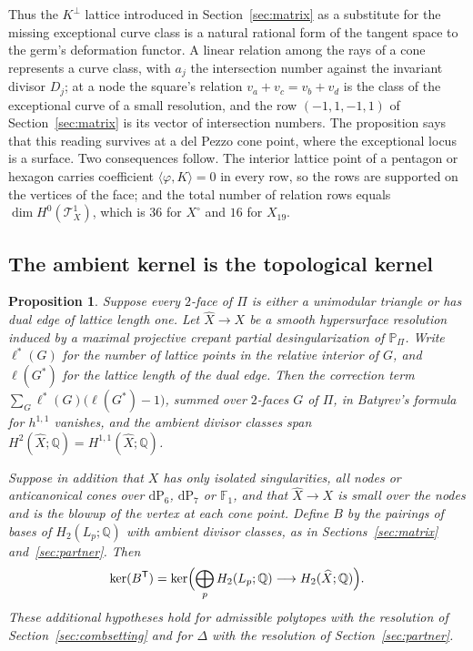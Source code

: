 \documentclass[11pt]{amsart}
\newtheorem{proposition}[theorem]{Proposition}
\theoremstyle{definition}
\theoremstyle{remark}
\theoremstyle{plain}
\newcommand{\QQ}{\mathbb{Q}}
\newcommand{\PP}{\mathbb{P}}
\newcommand{\dP}{\mathrm{dP}}
\newcommand{\Xh}{\widehat{X}}
\begin{document}
Thus the $K^{\perp}$ lattice introduced in Section~\ref{sec:matrix} as a
substitute for the missing exceptional curve class is a natural rational
form of the tangent space to the germ's deformation functor.  A
linear relation among the rays of a cone represents a
curve class, with $a_j$ the intersection number against the invariant
divisor $D_j$; at a node the square's relation $v_a+v_c=v_b+v_d$ is the
class of the exceptional curve of a small resolution, and the row
$(-1,1,-1,1)$ of Section~\ref{sec:matrix} is its vector of intersection
numbers.  The proposition says that this reading survives at a del Pezzo
cone point, where the exceptional locus is a surface.  Two consequences
follow.  The interior lattice point of a pentagon or hexagon
carries coefficient $\langle\varphi,K\rangle=0$ in every row, so the rows
are supported on the vertices of the face; and the total number of
relation rows equals $\dim H^0(\mathcal T^1_X)$, which is $36$ for $X^{\circ}$
and $16$ for $X_{19}$.

\subsection{The ambient kernel is the topological kernel}
\label{sec:kernelequal}

\begin{proposition}\label{prop:kernelequal}
Suppose every $2$-face of $\Pi$ is either a unimodular triangle or has
dual edge of lattice length one.  Let $\Xh\to X$ be a smooth hypersurface
resolution induced by a maximal projective crepant partial
desingularization of $\PP_{\Pi}$.  Write $\ell^{*}(G)$ for the number of lattice
points in the relative interior of $G$, and $\ell(G^{*})$ for the lattice
length of the dual edge.  Then the correction term
$\sum_{G}\ell^{*}(G)\bigl(\ell(G^{*})-1\bigr)$, summed over $2$-faces $G$
of $\Pi$, in Batyrev's formula \cite[Corollary~4.5.1]{Batyrev94} for
$h^{1,1}$ vanishes, and the ambient divisor classes span
$H^2(\Xh;\QQ)=H^{1,1}(\Xh;\QQ)$.

Suppose in addition that $X$ has only isolated singularities, all nodes
or anticanonical cones over $\dP_6$, $\dP_7$ or $\mathbb F_1$, and that
$\Xh\to X$ is small over the nodes and is the blowup of the vertex at each
cone point.  Define $B$ by the pairings of
bases of $H_2(L_p;\QQ)$ with ambient divisor classes, as in
Sections~\ref{sec:matrix} and~\ref{sec:partner}.  Then
\[
\ker(B^{\mathsf T})=
\ker\Bigl(\bigoplus_pH_2(L_p;\QQ)\longrightarrow H_2(\Xh;\QQ)\Bigr).
\]
These additional hypotheses hold for admissible polytopes with the
resolution of Section~\ref{sec:combsetting} and for
$\Delta$ with the resolution of Section~\ref{sec:partner}.
\end{proposition}
\end{document}
